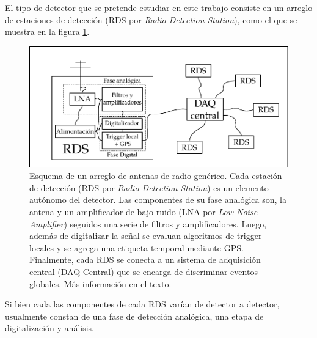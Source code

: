 	El tipo de detector que se pretende estudiar en este trabajo consiste en un arreglo de estaciones de detecci\'on (RDS por \emph{Radio Detection Station}), como el que se muestra en la figura \ref{fig:detectorSch}.
		\begin{figure}[ht!]
			\centering
			\includegraphics[width=\textwidth]{./fig/simulacionRadio/antennaSch}
			\caption{\label{fig:detectorSch} Esquema de un arreglo de antenas de radio gen\'erico.
			Cada estaci\'on de detecci\'on (RDS por \emph{Radio Detection Station}) es un elemento aut\'onomo del detector. Las componentes de su fase anal\'ogica son, la antena y un amplificador de bajo ruido (LNA por \emph{Low Noise Amplifier}) seguidos una serie de filtros y amplificadores. Luego, adem\'as de digitalizar la se\~nal se evaluan algoritmos de trigger locales y se agrega una etiqueta temporal mediante GPS.
			Finalmente, cada RDS se conecta a un sistema de adquisici\'on central (DAQ Central) que se encarga de discriminar eventos globales. M\'as informaci\'on en el texto.
			}
			
		\end{figure}
	Si bien cada las componentes de cada RDS var\'ian de detector a detector, usualmente constan de una fase de detecci\'on anal\'ogica, una etapa de digitalizaci\'on y an\'alisis.

